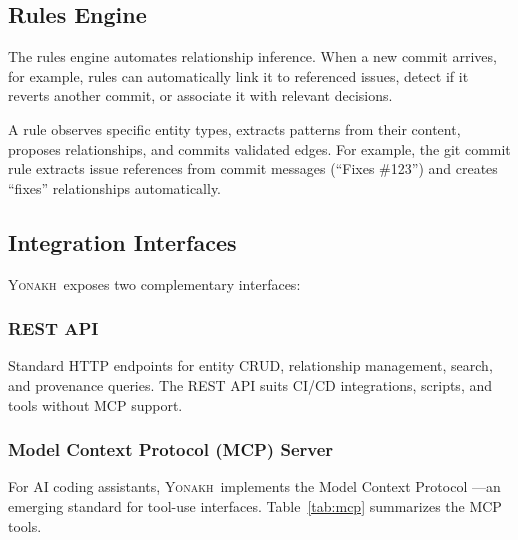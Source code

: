 \documentclass[10pt,journal,compsoc]{IEEEtran}
\newcommand{\yonakh}{\textsc{Yonakh}}
\begin{document}
\subsection{Rules Engine}

The rules engine automates relationship inference. When a new commit arrives, for example, rules can automatically link it to referenced issues, detect if it reverts another commit, or associate it with relevant decisions.

A rule observes specific entity types, extracts patterns from their content, proposes relationships, and commits validated edges. For example, the git commit rule extracts issue references from commit messages (``Fixes \#123'') and creates ``fixes'' relationships automatically.

\subsection{Integration Interfaces}

\yonakh\ exposes two complementary interfaces:

\subsubsection{REST API}

Standard HTTP endpoints for entity CRUD, relationship management, search, and provenance queries. The REST API suits CI/CD integrations, scripts, and tools without MCP support.

\subsubsection{Model Context Protocol (MCP) Server}

For AI coding assistants, \yonakh\ implements the Model Context Protocol \cite{mcp2024}---an emerging standard for tool-use interfaces. Table~\ref{tab:mcp} summarizes the MCP tools.
\end{document}

